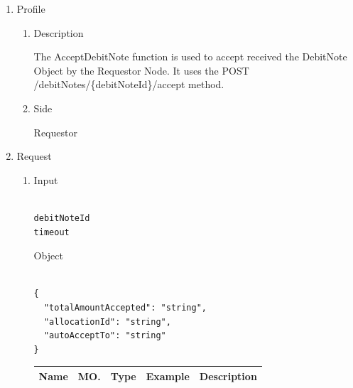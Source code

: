 \newpage




\begin{enumerate}

\item Profile

\begin{enumerate}

\item Description

The AcceptDebitNote function is used to accept received the DebitNote Object by the Requestor Node. 
It uses the POST /debitNotes/\{debitNoteId\}/accept method.

\item Side

Requestor

\end{enumerate}

\item Request

\begin{enumerate}

\item Input

\begin{tcolorbox}[boxrule=0pt, frame empty]
\begin{verbatim}

debitNoteId
timeout

\end{verbatim}
\end{tcolorbox}

Object

\begin{tcolorbox}[boxrule=0pt, frame empty]
\begin{verbatim}

{
  "totalAmountAccepted": "string",
  "allocationId": "string",
  "autoAcceptTo": "string"
}

\end{verbatim}
\end{tcolorbox}

\begin{table}[H]
\footnotesize

\begin{center}
\begin{tabular}{|p{3cm}|l|p{3cm}|p{3cm}|p{4cm}|} 
\hline
\rowcolor{lightgray}	Name	& MO.	& Type	& Example & 	Description \\
\hline


\end{tabular}
\end{center}
\end{table}
\end{enumerate}
\end{enumerate}
